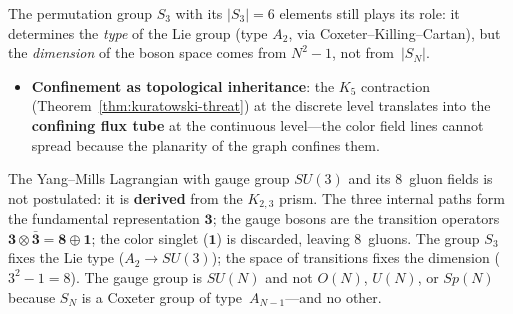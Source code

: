 The permutation group $S_3$ with its $|S_3| = 6$ elements still
plays its role: it determines the \emph{type} of the Lie group (type
$A_2$, via Coxeter--Killing--Cartan), but the \emph{dimension} of
the boson space comes from $N^2 - 1$, not from~$|S_N|$.

\begin{itemize}
  \item \textbf{Confinement as topological inheritance}: the
    $K_5$ contraction (Theorem~\ref{thm:kuratowski-threat}) at the
    discrete level translates into the \textbf{confining flux tube}
    at the continuous level---the color field lines cannot spread
    because the planarity of the graph confines them.
\end{itemize}

\begin{result}[title={The 8 gluons from bipartite topology}]
\label{res:yang-mills-8-gluons}
The Yang--Mills Lagrangian with gauge group $SU(3)$ and its 8~gluon
fields is not postulated: it is \textbf{derived} from the $K_{2,3}$ prism.
The three internal paths form the fundamental representation
$\mathbf{3}$; the gauge bosons are the transition operators
$\mathbf{3} \otimes \bar{\mathbf{3}} = \mathbf{8} \oplus \mathbf{1}$;
the color singlet ($\mathbf{1}$) is discarded, leaving 8~gluons.
The group $S_3$ fixes the Lie type ($A_2 \to SU(3)$); the space of
transitions fixes the dimension ($3^2 - 1 = 8$). The gauge group is
$SU(N)$ and not $O(N)$, $U(N)$, or $Sp(N)$ because $S_N$ is a Coxeter
group of type~$A_{N-1}$---and no other.
\end{result}

